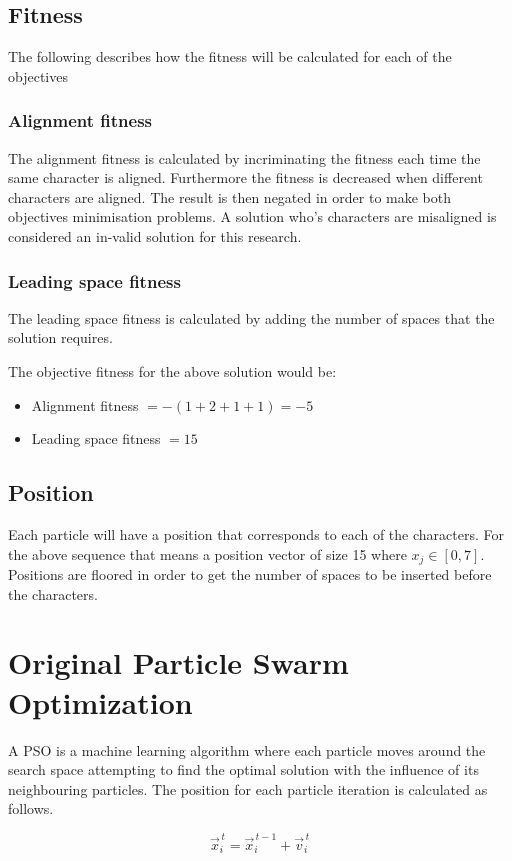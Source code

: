 \documentclass[conference]{IEEEtran}
\begin{document}
\subsection{Fitness}
\noindent The following describes how the fitness will be calculated for each of the objectives
\subsubsection{Alignment fitness}
The alignment fitness is calculated by incriminating the fitness each time the same character is aligned. Furthermore the fitness is decreased when different characters are aligned. The result is then negated in order to make both objectives minimisation problems. A solution who's characters are misaligned is considered an in-valid solution for this research.

\subsubsection{Leading space fitness}
The leading space fitness is calculated by adding the number of spaces that the solution requires.

The objective fitness for the above solution would be:
\begin{itemize}
	\item Alignment fitness $= -(1 + 2 + 1 + 1) = -5$
	\item Leading space fitness $= 15$
\end{itemize}
\subsection{Position}
Each particle will have a position that corresponds to each of the characters. For the above sequence that means a position vector of size 15 where $x_j \in [0, 7]$. Positions are floored in order to get the number of spaces to be inserted before the characters.


\section{Original Particle Swarm Optimization}
A \ac{PSO} is a machine learning algorithm where each particle moves around the search space attempting to find the optimal solution with the influence of its neighbouring particles. The position for each particle iteration is calculated as follows.

\begin{equation} \label{eq:pso:update-position}
\vec{x}_{i}^{\,t} = \vec{x}_{i}^{\,t-1} + \vec{v}_{i}^{\,t}
\end{equation}
\end{document}
